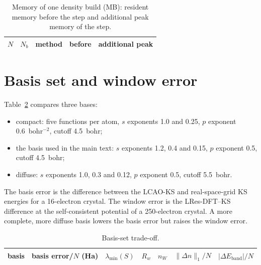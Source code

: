 \documentclass[aps,prb,onecolumn,superscriptaddress,floatfix]{revtex4-2}
\begin{document}
\begin{table}[h]
\caption{\label{tab:mem}Memory of one density build (MB): resident memory before the step and additional peak memory of the
step.}
\begin{ruledtabular}
\begin{tabular}{rrlrr}
$N$ & $N_b$ & method & before & additional peak \\
\hline

\end{tabular}
\end{ruledtabular}
\end{table}

\section{Basis set and window error}

Table~\ref{tab:basis} compares three bases:
\begin{itemize}
\item compact: five functions per atom, $s$ exponents 1.0 and 0.25, $p$ exponent 0.6~bohr$^{-2}$, cutoff 4.5~bohr;
\item the basis used in the main text: $s$ exponents 1.2, 0.4 and 0.15, $p$ exponent 0.5, cutoff 4.5~bohr;
\item diffuse: $s$ exponents 1.0, 0.3 and 0.12, $p$ exponent 0.5, cutoff 5.5~bohr.
\end{itemize}
The basis error is the difference between the LCAO-KS and real-space-grid KS energies for a 16-electron crystal. The window
error is the LRes-DFT--KS difference at the self-consistent potential of a 250-electron crystal. A more complete, more
diffuse basis lowers the basis error but raises the window error.

\begin{table}[h]
\caption{\label{tab:basis}Basis-set trade-off.}
\begin{ruledtabular}
\begin{tabular}{lrrrrrr}
basis & basis error/$N$ (Ha) & $\lambda_\mathrm{min}(S)$ & $R_w$ & $n_W$ & $\|\Delta n\|_1/N$ & $|\Delta E_\mathrm{band}|/N$ \\
\hline

\end{tabular}
\end{ruledtabular}
\end{table}
\end{document}
